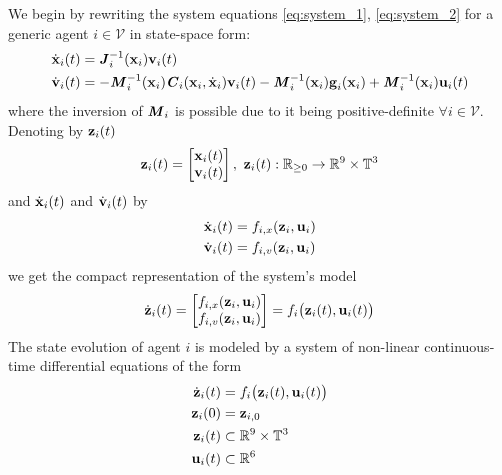 We begin by rewriting the system equations \eqref{eq:system_1},
\eqref{eq:system_2} for a generic agent $i \in \mathcal{V}$ in state-space form:
\begin{subequations}
\begin{align}
  \dot{\bm{\mathbf{x}}}_i(t) &= \bm{\mathit{J}}_i^{-1}(\bm{\mathbf{x}}_i) \bm{\mathbf{v}}_i(t) \\
  \dot{\bm{\mathbf{v}}}_i(t) &= -\bm{\mathit{M}}_i^{-1}(\bm{\mathbf{x}}_i)\bm{\mathit{C}}_i(\bm{\mathbf{x}}_i,\dot{\bm{\mathbf{x}}}_i) \bm{\mathbf{v}}_i(t)
    - \bm{\mathit{M}}_i^{-1}(\bm{\mathbf{x}}_i)\bm{\mathbf{g}}_i(\bm{\mathbf{x}}_i)
    + \bm{\mathit{M}}_i^{-1}(\bm{\mathbf{x}}_i)\bm{\mathbf{u}}_i(t)
\end{align}
\label{eq:state_space_system_2}
\end{subequations}
where the inversion of $\bm{\mathit{M}}_i$ is possible due to it being
positive-definite $\forall i \in \mathcal{V}$. Denoting by $\bm{\mathbf{z}}_i(t)$
\begin{align}
  \bm{\mathbf{z}}_i(t) =
    \begin{bmatrix}
      \bm{\mathbf{x}}_i(t) \\
      \bm{\mathbf{v}}_i(t) \\
    \end{bmatrix},\
    \bm{\mathbf{z}}_i(t) : \mathbb{R}_{\geq 0} \to \mathbb{R}^9 \times \mathbb{T}^3
\end{align}
and
$\dot{\bm{\mathbf{x}}}_i(t)$ and $\dot{\bm{\mathbf{v}}}_i(t)$ by
\begin{subequations}
\begin{align}
  \dot{\bm{\mathbf{x}}}_i(t) &= f_{i,x}(\bm{\mathbf{z}}_i, \bm{\mathbf{u}}_i) \\
  \dot{\bm{\mathbf{v}}}_i(t) &= f_{i,v}(\bm{\mathbf{z}}_i, \bm{\mathbf{u}}_i)
\end{align}
\end{subequations}
we get the compact representation of the system's model
\begin{align}
  \dot{\bm{\mathbf{z}}}_i(t) =
    \begin{bmatrix}
      f_{i,x}(\bm{\mathbf{z}}_i, \bm{\mathbf{u}}_i) \\
      f_{i,v}(\bm{\mathbf{z}}_i, \bm{\mathbf{u}}_i)
    \end{bmatrix} =
 f_i \big(\bm{\mathbf{z}}_i (t), \bm{\mathbf{u}}_i (t)\big)
\end{align}
The state evolution of agent $i$ is modeled by a system of non-linear
continuous-time differential equations of the form
\begin{align}
  \dot{\bm{\mathbf{z}}}_i(t) &= f_i \big(\bm{\mathbf{z}}_i (t), \bm{\mathbf{u}}_i (t)\big) \label{eq:non_perturbed_system_2}\\
  \bm{\mathbf{z}}_i(0) &= \bm{\mathbf{z}}_{i,0} \\
  \bm{\mathbf{z}}_i (t) & \subset \mathbb{R}^{9} \times \mathbb{T}^3 \\
  \bm{\mathbf{u}}_i (t) & \subset \mathbb{R}^6
\end{align}
